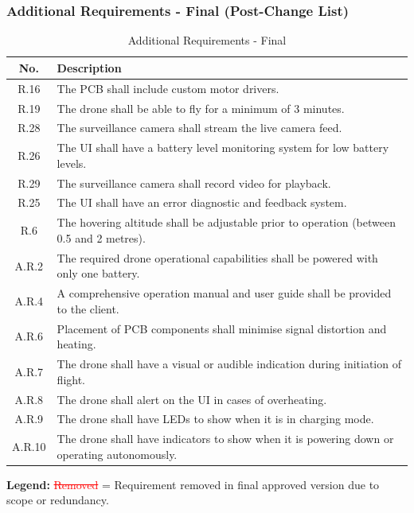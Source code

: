 \subsubsection{Additional Requirements - Final (Post-Change List)}

\begin{table}[H]
\centering
\caption{Additional Requirements - Final}
\begin{tabular}{|c|p{11cm}|}
\hline
\textbf{No.} & \textbf{Description} \\ \hline
R.16 & The PCB shall include custom motor drivers. \\ \hline
R.19 & The drone shall be able to fly for a minimum of 3 minutes. \\ \hline
R.28 & The surveillance camera shall stream the live camera feed. \\ \hline
R.26 & The UI shall have a battery level monitoring system for low battery levels. \\ \hline
R.29 & The surveillance camera shall record video for playback. \\ \hline
R.25 & The UI shall have an error diagnostic and feedback system. \\ \hline
R.6 & The hovering altitude shall be adjustable prior to operation (between 0.5 and 2 metres). \\ \hline
A.R.2 & The required drone operational capabilities shall be powered with only one battery. \\ \hline
A.R.4 & A comprehensive operation manual and user guide shall be provided to the client. \\ \hline
A.R.6 & Placement of PCB components shall minimise signal distortion and heating. \\ \hline
A.R.7 & The drone shall have a visual or audible indication during initiation of flight. \\ \hline
A.R.8 & The drone shall alert on the UI in cases of overheating. \\ \hline
A.R.9 & The drone shall have LEDs to show when it is in charging mode. \\ \hline
A.R.10 & The drone shall have indicators to show when it is powering down or operating autonomously. \\ \hline
\end{tabular}
\end{table}

\textbf{Legend:}  
\textcolor{red}{\sout{Removed}} = Requirement removed in final approved version due to scope or redundancy.

